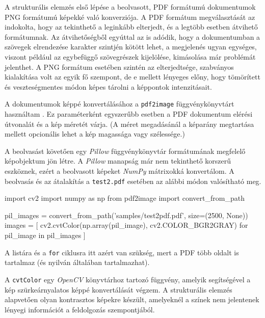 \label{chap:ocr}

A strukturális elemzés első lépése a beolvasott, PDF formátumú dokumentumok PNG formátumú képekké való konverziója.
A PDF formátum megválasztását az indokolta, hogy az tekinthető a leginkább elterjedt, és a legtöbb esetben átvihető formátumnak.
Az átvihetőségből egyúttal az is adódik, hogy a dokumentumban a szövegek elrendezése karakter szintjén kötött lehet, a megjelenés ugyan egységes, viszont például az egybefüggő szövegrészek kijelölése, kimásolása már problémát jelenthet.
A PNG formátum esetében szintén az elterjedtsége, szabványos kialakítása volt az egyik fő szempont, de e mellett lényeges előny, hogy tömörített és veszteségmentes módon képes tárolni a képpontok intenzitásait.


A dokumentumok képpé konvertálásához a \texttt{pdf2image} függvénykönyvtárt használtam \cite{pdf2image}.
Ez paraméterként egyszerűbb esetben a PDF dokumentum elérési útvonalát és a kép méretét várja.
(A méret megadásánál a képarány megtartása mellett opcionális lehet a kép magassága vagy szélessége.)

A beolvasást követően egy \textit{Pillow} \cite{clark2015pillow} függvénykönyvtár formátumának megfelelő képobjektum jön létre.
A \textit{Pillow} manapság már nem tekinthető korszerű eszköznek, ezért a beolvasott képeket \textit{NumPy} \cite{oliphant2006guide} mátrixokká konvertálom.
A beolvasás és az átalakítás a \texttt{test2.pdf} esetében az alábbi módon valósítható meg.

\begin{python}
import cv2
import numpy as np
from pdf2image import convert_from_path

pil_images = convert_from_path('samples/test2pdf.pdf', size=(2500, None))
images = [
    cv2.cvtColor(np.array(pil_image), cv2.COLOR_BGR2GRAY)
    for pil_image in pil_images
]
\end{python}

A listára és a \texttt{for} ciklusra itt azért van szükség, mert a PDF több oldalt is tartalmaz (és nyilván általában tartalmazhat).

A \texttt{cvtColor} egy \textit{OpenCV} könyvtárhoz tartozó függvény, amelyik segítségével a kép szürkeárnyalatos képpé konvertálását végzem.
A strukturális elemzés alapvetően olyan kontrasztos képekre készült, amelyeknél a színek nem jelentenek lényegi információt a feldolgozás szempontjából.

